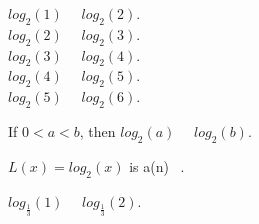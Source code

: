 \documentclass{ximera}
\author{Lee Wayand}
\begin{document}
\begin{example}


\begin{question}


$log_2(1)$ \, \wordChoice{\choice[correct]{$<$} \choice{$>$}} \, $log_2(2)$.  \\

$log_2(2)$ \, \wordChoice{\choice[correct]{$<$} \choice{$>$}} \, $log_2(3)$.  \\

$log_2(3)$ \, \wordChoice{\choice[correct]{$<$} \choice{$>$}} \, $log_2(4)$.  \\

$log_2(4)$ \, \wordChoice{\choice[correct]{$<$} \choice{$>$}} \, $log_2(5)$.  \\

$log_2(5)$ \, \wordChoice{\choice[correct]{$<$} \choice{$>$}} \, $log_2(6)$.  \\


\end{question}




\begin{question}



If $0 < a < b$, then $log_2(a)$ \, \wordChoice{\choice[correct]{$<$} \choice{$>$}} \, $log_2(b)$.  \\



\end{question}





\begin{question}



$L(x) = log_2(x)$  is a(n) \,  .  \\



\end{question}














\begin{question}


$log_{\tfrac{1}{3}}(1)$ \, \wordChoice{\choice{$<$} \choice[correct]{$>$}} \, $log_{\tfrac{1}{3}}(2)$.  \\


\end{question}
\end{example}
\end{document}
